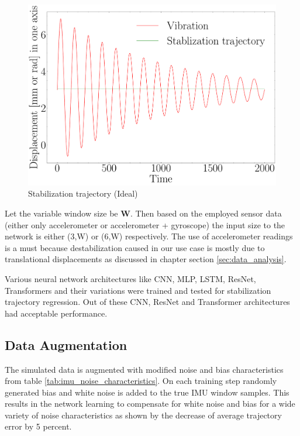 \begin{figure}
    \centering
    \includegraphics[scale=0.25]{images/fig_chapter2/stab_traj_ideal.pdf}
    \caption{Stabilization trajectory (Ideal)}
    \label{fig:stab_traj_ideal}
\end{figure}

Let the variable window size be \textbf{W}. Then based on the employed sensor data (either only accelerometer or accelerometer + gyroscope) the input size to the network is either (3,W) or (6,W) respectively. The use of accelerometer readings is a must because destabilization caused in our use case is mostly due to translational displacements as discussed in chapter section \ref{sec:data_analysis}. 

Various neural network architectures like CNN, MLP, LSTM, ResNet, Transformers and their variations were trained and tested for stabilization trajectory regression. Out of these CNN, ResNet and Transformer architectures had acceptable performance. 

\subsection{Data Augmentation}
The simulated data is augmented with modified noise and bias characteristics from table \ref{tab:imu_noise_characteristics}. On each training step randomly generated bias and white noise is added to the true IMU window samples. This results in the network learning to compensate for white noise and bias for a wide variety of noise characteristics as shown by the decrease of average trajectory error by 5 percent.

